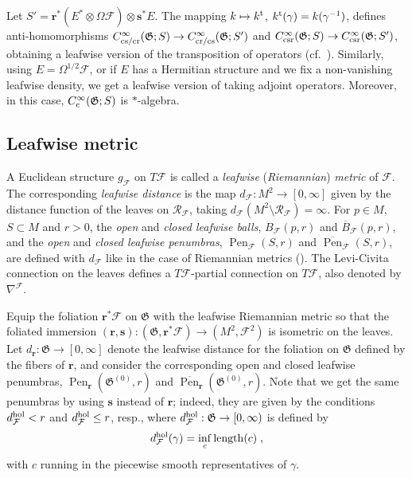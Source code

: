 \documentclass{memo-l}
\theoremstyle{plain}
\theoremstyle{definition}
\theoremstyle{remark}
\newcommand{\FF}{\mathcal{F}}
\newcommand{\RR}{\mathcal{R}}
\newcommand{\fG}{\mathfrak{G}}
\newcommand{\bfr}{\boldsymbol{r}}
\newcommand{\bfs}{\boldsymbol{s}}
\newcommand{\Pen}{\operatorname{Pen}}
\newcommand{\length}{\operatorname{length}}
\newcommand{\trans}{{\text{\rm t}}}
\newcommand{\Cinftyc}{C^\infty_{\text{\rm c}}}
\numberwithin{section}{chapter}
\numberwithin{equation}{section}%
\begin{document}
Let $S'=\bfr^*(E^*\otimes\Omega\FF)\otimes \bfs^*E$. The mapping $k\mapsto k^\trans$, $ k^\trans(\gamma)=k(\gamma^{-1})$, defines anti-homomorphisms $C^\infty_{\text{\rm cs/cr}}(\fG;S)\to C^\infty_{\text{\rm cr/cs}}(\fG;S')$ and $C^\infty_{\text{\rm csr}}(\fG;S)\to C^\infty_{\text{\rm csr}}(\fG;S')$, obtaining a leafwise version of the transposition of operators (cf.\ ). Similarly, using $E=\Omega^{1/2}\FF$, or if $E$ has a Hermitian structure and we fix a non-vanishing leafwise density, we get a leafwise version of taking adjoint operators. Moreover, in this case, $\Cinftyc(\fG;S)$ is $*$-algebra.



\subsection{Leafwise metric}\label{ss: leafwise metric}

A Euclidean structure $g_\FF$ on $T\FF$ is called a \emph{leafwise} (\emph{Riemannian}) \emph{metric}  of $\FF$. The corresponding \emph{leafwise distance}  is the map $d_\FF:M^2\to[0,\infty]$ given by the distance function of the leaves on $\RR_\FF$, taking $d_\FF(M^2\setminus\RR_\FF)=\infty$. For $p\in M$, $S\subset M$ and $r>0$, the \emph{open} and \emph{closed leafwise balls}, $B_\FF(p,r)$ and $\overline B_\FF(p,r)$, and the \emph{open} and \emph{closed leafwise penumbras},  $\Pen_\FF(S,r)$ \index{$\Pen_\FF(S,r)$} and $\overline{\Pen}_\FF(S,r)$, \index{$\overline{\Pen}_\FF(S,r)$} are defined with $d_\FF$ like in the case of Riemannian metrics (). The Levi-Civita connection on the leaves defines a $T\FF$-partial connection on $T\FF$, also denoted by $\nabla^\FF$.

Equip the foliation $\bfr^*\FF$ on $\fG$ with the leafwise Riemannian metric so that the foliated immersion $(\bfr,\bfs):(\fG,\bfr^*\FF)\to(M^2,\FF^2)$ is isometric on the leaves. Let $d_{\bfr}:\fG\to[0,\infty]$ denote the leafwise distance for the foliation on $\fG$ defined by the fibers of $\bfr$, and consider the corresponding open and closed leafwise penumbras, $\Pen_{\bfr}(\fG^{(0)},r)$ and $\overline{\Pen}_{\bfr}(\fG^{(0)},r)$. Note that we get the same penumbras by using $\bfs$ instead of $\bfr$; indeed, they are given by the conditions $d_\FF^{\text{\rm hol}}<r$ and $d_\FF^{\text{\rm hol}}\le r$, resp., where $d_\FF^{\text{\rm hol}}:\fG\to[0,\infty)$ is defined by
\[
d_\FF^{\text{\rm hol}}(\gamma)=\inf_c\length(c)\;,
\]
with $c$ running in the piecewise smooth representatives of $\gamma$.
\end{document}
